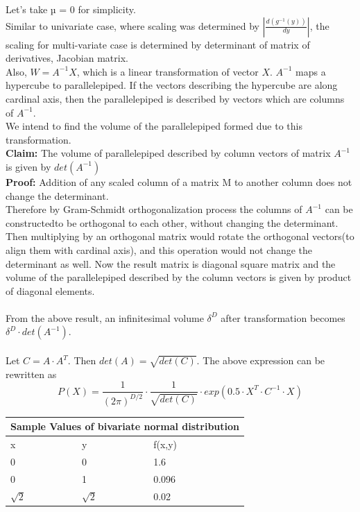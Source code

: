 \documentclass{article}
\begin{document}
Let's take µ = 0 for simplicity.\\
Similar to univariate case, where scaling was determined by $|\frac{d(g^{-1}(y))}{dy}|$, the scaling for multi-variate
case is determined by determinant of matrix of derivatives, Jacobian matrix.\\
Also, $W = A^{-1}X$, which is a linear transformation of vector $X$. $A^{-1}$ maps a hypercube to parallelepiped. If the vectors describing the hypercube are along cardinal axis, then the parallelepiped is described by vectors which are columns of $A^{-1}$.\\
We intend to find the volume of the parallelepiped formed due to this transformation.\\
{\bfseries Claim:} The volume of parallelepiped described by column vectors of matrix $A^{-1}$ is given by $det(A^{-1})$\\
{\bfseries Proof:} Addition of any scaled column of a matrix M to another column does not change the
determinant.\\
Therefore by Gram-Schmidt orthogonalization process the columns of $A^{-1}$ can be constructedto be orthogonal to each other, without changing the determinant. Then multiplying by an orthogonal matrix would rotate the orthogonal vectors(to align them with cardinal axis), and this
operation would not change the determinant as well. Now the result matrix is diagonal square
matrix and the volume of the parallelepiped described by the column vectors is given by product
of diagonal elements.\\
\\
From the above result, an infinitesimal volume $\delta^D$ after transformation becomes $\delta^D\cdot det(A^{-1})$.\\
\\
Let $C = A \cdot A^T$. Then $det(A)=\sqrt{det(C)}$. The above expression can be rewritten as
\begin{equation}
    P(X)=\frac{1}{(2\pi)^{D/2}}\cdot \frac{1}{\sqrt{det(C)}}\cdot exp(0.5\cdot X^T \cdot C^{-1}\cdot X)
\end{equation}

\begin{tabular}{|l|l||l|}
\hline
\multicolumn{3}{|c|}{Sample Values of bivariate normal distribution}\\
\hline
x&y&f(x,y)\\
\hline
0&0&1.6\\
0&1&0.096\\
$\sqrt{2}$&$\sqrt{2}$&0.02\\
\hline
\end{tabular}


\printbibliography
\end{document}
